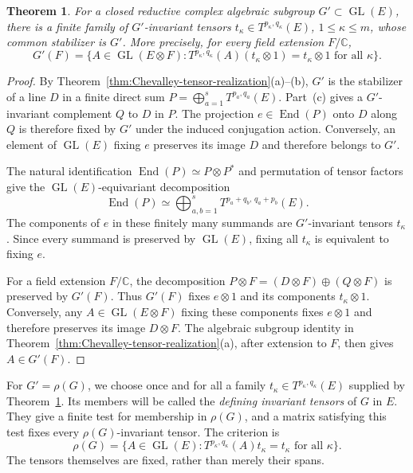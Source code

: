 \documentclass[11pt,leqno]{amsart}
\numberwithin{equation}{section}
\theoremstyle{plain}
\newtheorem{theorem}{Theorem}[section]
\theoremstyle{definition}
\theoremstyle{plain}
\theoremstyle{definition}
\theoremstyle{remark}
\begin{document}
\begin{theorem}\label{thm:finite-invariant-tensors}
For a closed reductive complex algebraic subgroup $G'\subset\operatorname{GL}(E)$, there is a finite family of $G'$-invariant tensors $t_\kappa\in T^{p_\kappa,q_\kappa}(E)$, $1\le\kappa\le m$, whose common stabilizer is $G'$.  More precisely, for every field extension $F/\mathbb C$,
\[
 G'(F)=\{A\in\operatorname{GL}(E\otimes F):
 T^{p_\kappa,q_\kappa}(A)(t_\kappa\otimes1)=t_\kappa\otimes1\text{ for all }\kappa\}.
\]
\end{theorem}
\begin{proof}
By Theorem~\ref{thm:Chevalley-tensor-realization}(a)--(b), $G'$ is the stabilizer of a line $D$ in a finite direct sum $P=\bigoplus_{a=1}^{s}T^{p_a,q_a}(E)$.  Part~(c) gives a $G'$-invariant complement $Q$ to $D$ in $P$.  The projection $e\in\operatorname{End}(P)$ onto $D$ along $Q$ is therefore fixed by $G'$ under the induced conjugation action.  Conversely, an element of $\operatorname{GL}(E)$ fixing $e$ preserves its image $D$ and therefore belongs to $G'$.

The natural identification $\operatorname{End}(P)\simeq P\otimes P^*$ and permutation of tensor factors give the $\operatorname{GL}(E)$-equivariant decomposition
\[
 \operatorname{End}(P)\simeq
 \bigoplus_{a,b=1}^{s}T^{p_a+q_b,\,q_a+p_b}(E).
\]
The components of $e$ in these finitely many summands are $G'$-invariant tensors $t_\kappa$.  Since every summand is preserved by $\operatorname{GL}(E)$, fixing all $t_\kappa$ is equivalent to fixing $e$.

For a field extension $F/\mathbb C$, the decomposition $P\otimes F=(D\otimes F)\oplus(Q\otimes F)$ is preserved by $G'(F)$.  Thus $G'(F)$ fixes $e\otimes1$ and its components $t_\kappa\otimes1$.  Conversely, any $A\in\operatorname{GL}(E\otimes F)$ fixing these components fixes $e\otimes1$ and therefore preserves its image $D\otimes F$.  The algebraic subgroup identity in Theorem~\ref{thm:Chevalley-tensor-realization}(a), after extension to $F$, then gives $A\in G'(F)$.
\end{proof}

For $G'=\rho(G)$, we choose once and for all a family $t_\kappa\in T^{p_\kappa,q_\kappa}(E)$ supplied by Theorem~\ref{thm:finite-invariant-tensors}.  Its members will be called the \emph{defining invariant tensors} of $G$ in $E$.  They give a finite test for membership in $\rho(G)$, and a matrix satisfying this test fixes every $\rho(G)$-invariant tensor.  The criterion is
\begin{equation}\label{eq:finite-defining-tensors}
 \rho(G)=\{A\in\operatorname{GL}(E):T^{p_\kappa,q_\kappa}(A)t_\kappa=t_\kappa\text{ for all }\kappa\}.
\end{equation}
The tensors themselves are fixed, rather than merely their spans.
\end{document}
